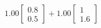 \documentclass[preview]{standalone}
\begin{document}
\begin{align*}
1.00 \begin{bmatrix} 0.8 \\ 0.5 \end{bmatrix} + 1.00 \begin{bmatrix} 1 \\ 1.6 \end{bmatrix}
\end{align*}
\end{document}
